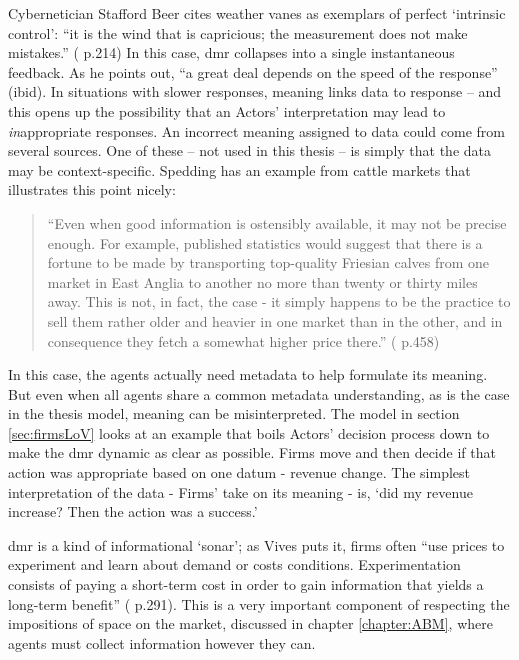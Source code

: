{Cybernetician Stafford Beer cites weather vanes as exemplars of perfect `intrinsic control': ``it is the wind that is capricious; the measurement does not make mistakes.'' (\citealt{beer_what_2002} p.214) In this case, \gls{dmr} collapses into a single instantaneous feedback. As he points out, ``a great deal depends on the speed of the response'' (ibid). In situations with slower responses, meaning links data to response – and this opens up the possibility that an Actors' interpretation may lead to \emph{in}appropriate responses. An incorrect meaning assigned to data could come from several sources. One of these – not used in this thesis – is simply that the data may be context-specific. Spedding has an example from cattle markets that illustrates this point nicely: 

\begin{quote}
``Even when good information is ostensibly available, it may not be precise enough. For example, published statistics would suggest that there is a fortune to be made by transporting top-quality Friesian calves from one market in East Anglia to another no more than twenty or thirty miles away. This is not, in fact, the case - it simply happens to be the practice to sell them rather older and heavier in one market than in the other, and in consequence they fetch a somewhat higher price there.'' (\citealt{spedding_freams_1983} p.458)
\end{quote}

In this case, the agents actually need metadata to help formulate its meaning. But even when all agents share a common metadata understanding, as is the case in the thesis model, meaning can be misinterpreted. The model in section \ref{sec:firmsLoV} looks at an example that boils Actors' decision process down to make the \gls{dmr} dynamic as clear as possible. Firms move and then decide if that action was appropriate based on one datum - revenue change. The simplest interpretation of the data - Firms' take on its meaning - is, `did my revenue increase? Then the action was a success.' 

\gls{dmr} is a kind of informational `sonar'; as Vives puts it, firms often ``use prices to experiment and learn about demand or costs conditions. Experimentation consists of paying a short-term cost in order to gain information that yields a long-term benefit'' (\citealt{vives_oligopoly_2001} p.291). This is a very important component of respecting the impositions of space on the market, discussed in chapter \ref{chapter:ABM}, where agents must collect information however they can.

}
